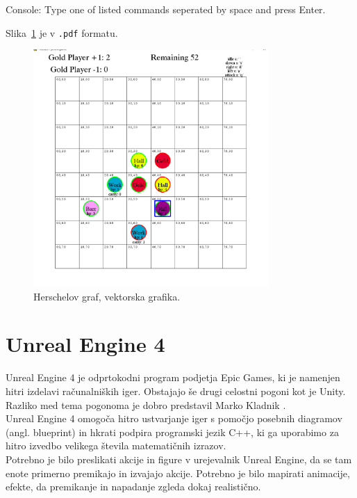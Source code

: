 \documentclass[a4paper, 12pt]{book}
\begin{document}
Console:
Type one of listed commands seperated by space and press Enter.

Slika~\ref{visualization_pygame} je v {\tt .pdf} formatu.
\begin{figure}[h]
	\begin{center}
		\includegraphics[width=0.8\textwidth]{visualization_pygame.pdf}
	\end{center}
	\caption{Herschelov graf, vektorska grafika.}
	\label{visualization_pygame}
\end{figure}

\section{Unreal Engine 4}

Unreal Engine 4 je odprtokodni program podjetja Epic Games, ki je namenjen hitri izdelavi računalniških iger. Obstajajo še drugi celostni pogoni kot je Unity.\\
Razliko med tema pogonoma je dobro predstavil Marko Kladnik \cite{diploma2}.\\
Unreal Engine 4 omogoča hitro ustvarjanje iger s pomočjo posebnih diagramov (angl. blueprint) in hkrati podpira programski jezik C++, ki ga uporabimo za hitro izvedbo velikega števila matematičnih izrazov.\\

Potrebno je bilo preslikati akcije in figure v urejevalnik Unreal Engine, da se tam enote primerno premikajo in izvajajo akcije.
Potrebno je bilo mapirati animacije, efekte, da premikanje in napadanje zgleda dokaj realistično.
\end{document}
